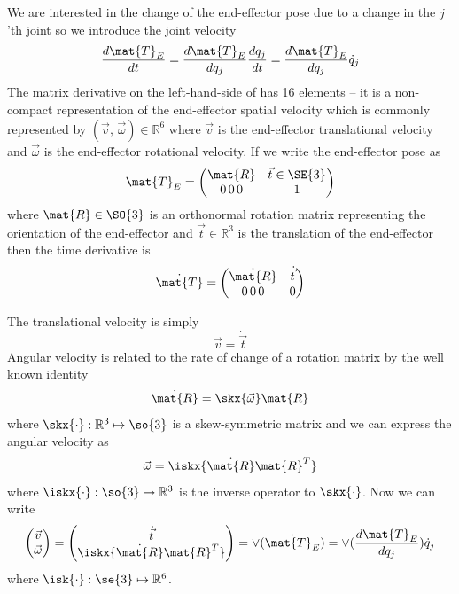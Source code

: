 \documentclass[11pt]{article}
\begin{document}
We are interested in the change of the end-effector pose due to a change in the $j$'th joint so we introduce the joint velocity
\begin{equation}
\frac{d \mat{T}_E}{dt} = \frac{d \mat{T}_E}{d q_j} \frac{d q_j}{dt} = \frac{d \mat{T}_E}{d q_j} \dot{q}_j\label{eq:dTdt}
\end{equation}
The  matrix derivative on the left-hand-side of  has 16 elements  -- it is a non-compact representation of the end-effector spatial velocity which is commonly represented by
$(\vec{v},\, \vec{\omega}) \in \mathbb{R}^6$ where $\vec{v}$ is the end-effector translational velocity and $\vec{\omega}$ is the end-effector rotational velocity.
If we write the end-effector pose as
\[
\mat{T}_E = \begin{pmatrix} \mat{R} &\vec{t} \in \SE{3} \\
0\, 0\, 0 & 1 \end{pmatrix}
\]
where $\mat{R} \in \SO{3}$ is an orthonormal rotation matrix representing the orientation of the end-effector and $\vec{t} \in \mathbb{R}^3$ is the translation
of the end-effector then the time derivative  is
\begin{equation}
\dot{\mat{T}} = \begin{pmatrix} \dot{\mat{R}} & \dot{\vec{t}} \\ \label{eq:dTdt2}
0\, 0\, 0 & 0 \end{pmatrix}
\end{equation}


The translational velocity is simply
\[
\vec{v} = \dot{\vec{t}}
\]
Angular velocity is related to the rate of change of a rotation matrix by the well known identity\cite{Corke17a}
\[
 \dot{\mat{R}} = \skx{\vec{\omega}} \mat{R}
 \]
 where $\skx{\cdot} : \mathbb{R}^3 \mapsto \so{3}$ is a skew-symmetric matrix and we can express the angular velocity as
\[
\vec{\omega} = \iskx{ \dot{\mat{R}} \mat{R}^T }
 \]
where $\iskx{\cdot} :  \so{3} \mapsto \mathbb{R}^3 $ is the inverse operator to $\skx{\cdot}$.
Now we can write
 \[
\begin{pmatrix} \vec{v} \\ \vec{\omega} \end{pmatrix} = \begin{pmatrix} \dot{\vec{t}} \\ \iskx{ \dot{\mat{R}} \mat{R}^T} \end{pmatrix} = \vee(\dot{\mat{T}_E}) =  \vee( \frac{d{\mat{T}_E}}{d q_j}) \dot{q}_j
 \]
 where $\isk{\cdot} :  \se{3} \mapsto \mathbb{R}^6 $.
\end{document}
